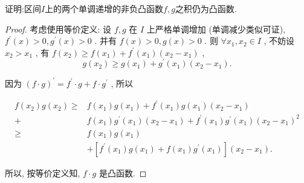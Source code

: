 
\begin{prob} 

    证明:区间$I$上的两个单调递增的非负凸函数$f ,g$之积仍为凸函数.

\end{prob} 

\begin{proof}
    考虑使用等价定义: 
    设  $f, g$  在  $I$  上严格单调增加 (单调减少类似可证),  $f^{\prime}(x)   >0, g^{\prime}(x)>0$ . 并有  $f(x)>0, g(x)>0$ . 则  $\forall x_{1}, x_{2} \in I$ , 不妨设  $x_{2}>x_{1}$ , 有  $f\left(x_{2}\right) \geqslant f\left(x_{1}\right)+f^{\prime}\left(x_{1}\right)\left(x_{2}-x_{1}\right)$ ,
$$
g\left(x_{2}\right) \geqslant g\left(x_{1}\right)+g^{\prime}\left(x_{1}\right)\left(x_{2}-x_{1}\right) .
$$

因为  $(f \cdot g)^{\prime}=f^{\prime} \cdot g+f \cdot g^{\prime}$ , 所以

$$
\begin{aligned}
f\left(x_{2}\right) g\left(x_{2}\right) \geqslant & f\left(x_{1}\right) g\left(x_{1}\right)+f^{\prime}\left(x_{1}\right) g\left(x_{1}\right)\left(x_{2}-x_{1}\right) \\
+& f\left(x_{1}\right) g^{\prime}\left(x_{1}\right)\left(x_{2}-x_{1}\right)+f^{\prime}\left(x_{1}\right) g^{\prime}\left(x_{1}\right)\left(x_{2}-x_{1}\right)^{2} \\
\geqslant & f\left(x_{1}\right) g\left(x_{1}\right) \\
&+\left[f^{\prime}\left(x_{1}\right) g\left(x_{1}\right)+f\left(x_{1}\right) g^{\prime}\left(x_{1}\right)\right]\left(x_{2}-x_{1}\right) .
\end{aligned}
$$

所以, 按等价定义知,  $f \cdot g$  是凸函数.
\end{proof}



